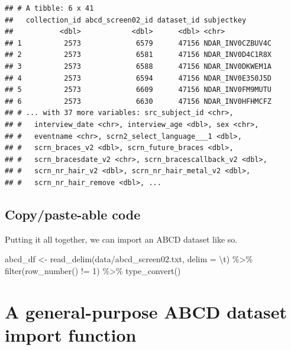 \documentclass[
]{book}
\newenvironment{Shaded}{\begin{snugshade}}{\end{snugshade}}
\newcommand{\AttributeTok}[1]{\textcolor[rgb]{0.77,0.63,0.00}{#1}}
\newcommand{\DecValTok}[1]{\textcolor[rgb]{0.00,0.00,0.81}{#1}}
\newcommand{\FunctionTok}[1]{\textcolor[rgb]{0.00,0.00,0.00}{#1}}
\newcommand{\NormalTok}[1]{#1}
\newcommand{\OtherTok}[1]{\textcolor[rgb]{0.56,0.35,0.01}{#1}}
\newcommand{\SpecialCharTok}[1]{\textcolor[rgb]{0.00,0.00,0.00}{#1}}
\newcommand{\StringTok}[1]{\textcolor[rgb]{0.31,0.60,0.02}{#1}}
\begin{document}
\begin{verbatim}
## # A tibble: 6 x 41
##   collection_id abcd_screen02_id dataset_id subjectkey      
##           <dbl>            <dbl>      <dbl> <chr>           
## 1          2573             6579      47156 NDAR_INV0CZBUV4C
## 2          2573             6581      47156 NDAR_INV0D4C1R8X
## 3          2573             6588      47156 NDAR_INV0DKWEM1A
## 4          2573             6594      47156 NDAR_INV0E350J5D
## 5          2573             6609      47156 NDAR_INV0FM9MUTU
## 6          2573             6630      47156 NDAR_INV0HFHMCFZ
## # ... with 37 more variables: src_subject_id <chr>,
## #   interview_date <chr>, interview_age <dbl>, sex <chr>,
## #   eventname <chr>, scrn2_select_language___1 <dbl>,
## #   scrn_braces_v2 <dbl>, scrn_future_braces <dbl>,
## #   scrn_bracesdate_v2 <chr>, scrn_bracescallback_v2 <dbl>,
## #   scrn_nr_hair_v2 <dbl>, scrn_nr_hair_metal_v2 <dbl>,
## #   scrn_nr_hair_remove <dbl>, ...
\end{verbatim}

\hypertarget{copypaste-able-code}{%
\subsection{Copy/paste-able code}\label{copypaste-able-code}}

Putting it all together, we can import an ABCD dataset like so.

\begin{Shaded}
\begin{Highlighting}[]
\NormalTok{abcd\_df }\OtherTok{\textless{}{-}} \FunctionTok{read\_delim}\NormalTok{(}\StringTok{\textquotesingle{}data/abcd\_screen02.txt\textquotesingle{}}\NormalTok{, }\AttributeTok{delim =} \StringTok{\textquotesingle{}}\SpecialCharTok{\textbackslash{}t}\StringTok{\textquotesingle{}}\NormalTok{) }\SpecialCharTok{\%\textgreater{}\%} 
  \FunctionTok{filter}\NormalTok{(}\FunctionTok{row\_number}\NormalTok{() }\SpecialCharTok{!=} \DecValTok{1}\NormalTok{) }\SpecialCharTok{\%\textgreater{}\%} 
  \FunctionTok{type\_convert}\NormalTok{()}
\end{Highlighting}
\end{Shaded}

\hypertarget{a-general-purpose-abcd-dataset-import-function}{%
\section{A general-purpose ABCD dataset import function}\label{a-general-purpose-abcd-dataset-import-function}}
\end{document}
